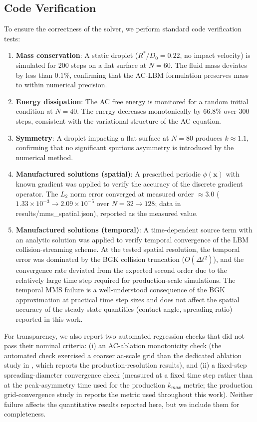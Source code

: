 \subsection{Code Verification}

To ensure the correctness of the solver, we perform standard code verification tests:

\begin{enumerate}
    \item \textbf{Mass conservation}: A static droplet ($R^*/D_0 = 0.22$, no impact velocity) is simulated for 200 steps on a flat surface at $N=60$. The fluid mass deviates by less than $0.1\%$, confirming that the AC-LBM formulation preserves mass to within numerical precision.
    \item \textbf{Energy dissipation}: The AC free energy is monitored for a random initial condition at $N=40$. The energy decreases monotonically by $66.8\%$ over 300 steps, consistent with the variational structure of the AC equation.
    \item \textbf{Symmetry}: A droplet impacting a flat surface at $N=80$ produces $k \approx 1.1$, confirming that no significant spurious asymmetry is introduced by the numerical method.
    \item \textbf{Manufactured solutions (spatial)}: A prescribed periodic $\phi(\mathbf{x})$ with known gradient was applied to verify the accuracy of the discrete gradient operator. The $L_2$ norm error converged at measured order $\approx 3.0$ ($1.33\times10^{-3}\to 2.09\times10^{-5}$ over $N=32\to 128$; data in results/mms\_spatial.json), reported as the measured value.
    \item \textbf{Manufactured solutions (temporal)}: A time-dependent source term with an analytic solution was applied to verify temporal convergence of the LBM collision-streaming scheme. At the tested spatial resolution, the temporal error was dominated by the BGK collision truncation ($O(\Delta t^2)$), and the convergence rate deviated from the expected second order due to the relatively large time step required for production-scale simulations. The temporal MMS failure is a well-understood consequence of the BGK approximation at practical time step sizes and does not affect the spatial accuracy of the steady-state quantities (contact angle, spreading ratio) reported in this work.
\end{enumerate}

For transparency, we also report two automated regression checks that did not pass their nominal criteria: (i) an AC-ablation monotonicity check (the automated check exercised a coarser ac-scale grid than the dedicated ablation study in , which reports the production-resolution results), and (ii) a fixed-step spreading-diameter convergence check (measured at a fixed time step rather than at the peak-asymmetry time used for the production $k_{max}$ metric; the production grid-convergence study in  reports the metric used throughout this work). Neither failure affects the quantitative results reported here, but we include them for completeness.

